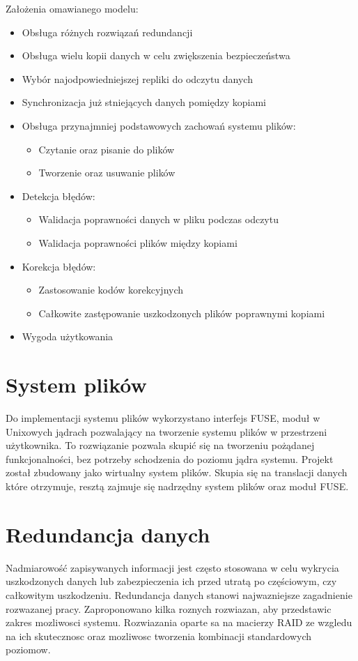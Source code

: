Założenia omawianego modelu:
\begin{itemize}
    \item Obsługa różnych rozwiązań redundancji
    \item Obsługa wielu kopii danych w celu zwiększenia bezpieczeństwa
    \item Wybór najodpowiedniejszej repliki do odczytu danych
    \item Synchronizacja już stniejących danych pomiędzy kopiami
	\item Obsługa przynajmniej podstawowych zachowań systemu plików:
		\begin{itemize}
			\item Czytanie oraz pisanie do plików
			\item Tworzenie oraz usuwanie plików
		\end{itemize}
	\item Detekcja błędów:
		\begin{itemize}
			\item Walidacja poprawności danych w pliku podczas odczytu
			\item Walidacja poprawności plików między kopiami 
		\end{itemize}
	\item Korekcja błędów:
		\begin{itemize}
			\item Zastosowanie kodów korekcyjnych
			\item Całkowite zastępowanie uszkodzonych plików poprawnymi kopiami
		\end{itemize}
    \item Wygoda użytkowania
\end{itemize}

\section{System plików}
Do implementacji systemu plików wykorzystano interfejs FUSE, moduł w Unixowych jądrach pozwalający na tworzenie systemu plików w przestrzeni użytkownika. To rozwiązanie pozwala skupić się na tworzeniu pożądanej funkcjonalności, bez potrzeby schodzenia do poziomu jądra systemu. Projekt został zbudowany jako wirtualny system plików. Skupia się na translacji danych które otrzymuje, resztą zajmuje się nadrzędny system plików oraz moduł FUSE. 

\section {Redundancja danych}
Nadmiarowość zapisywanych informacji jest często stosowana w celu wykrycia uszkodzonych danych lub zabezpieczenia ich przed utratą po częściowym, czy całkowitym uszkodzeniu.
Redundancja danych stanowi najwazniejsze zagadnienie rozwazanej pracy. Zaproponowano kilka roznych rozwiazan, aby przedstawic zakres mozliwosci systemu. Rozwiazania oparte sa na macierzy RAID ze wzgledu na ich skutecznosc oraz mozliwosc tworzenia kombinacji standardowych poziomow.

